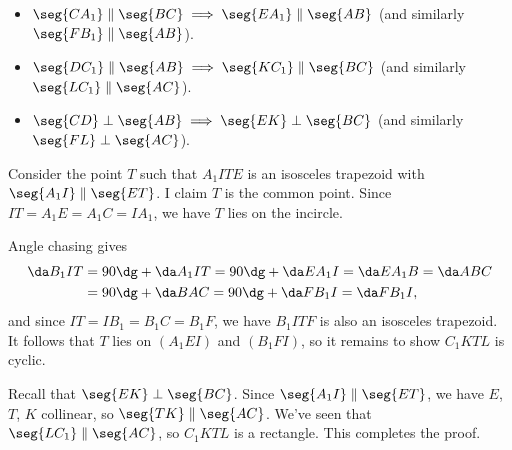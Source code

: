 \begin{itemize}[itemsep=0em]
    \item $\seg{CA_1}\parallel\seg{BC}\implies\seg{EA_1}\parallel\seg{AB}$ (and similarly $\seg{FB_1}\parallel\seg{AB}$).
    \item $\seg{DC_1}\parallel\seg{AB}\implies\seg{KC_1}\parallel\seg{BC}$ (and similarly $\seg{LC_1}\parallel\seg{AC}$).
    \item $\seg{CD}\perp\seg{AB}\implies\seg{EK}\perp\seg{BC}$ (and similarly $\seg{FL}\perp\seg{AC}$).
\end{itemize}
Consider the point $T$ such that $A_1ITE$ is an isosceles trapezoid with $\seg{A_1I}\parallel\seg{ET}$. I claim $T$ is the common point. Since $IT=A_1E=A_1C=IA_1$, we have $T$ lies on the incircle.

Angle chasing gives
\begin{align*}
    \da B_1IT&=90\dg+\da A_1IT=90\dg+\da EA_1I=\da EA_1B=\da ABC\\
    &=90\dg+\da BAC=90\dg+\da FB_1I=\da FB_1I,
\end{align*}
and since $IT=IB_1=B_1C=B_1F$, we have $B_1ITF$ is also an isosceles trapezoid. It follows that $T$ lies on $(A_1EI)$ and $(B_1FI)$, so it remains to show $C_1KTL$ is cyclic.

Recall that $\seg{EK}\perp\seg{BC}$. Since $\seg{A_1I}\parallel\seg{ET}$, we have $E$, $T$, $K$ collinear, so $\seg{TK}\parallel\seg{AC}$. We've seen that $\seg{LC_1}\parallel\seg{AC}$, so $C_1KTL$ is a rectangle. This completes the proof.

